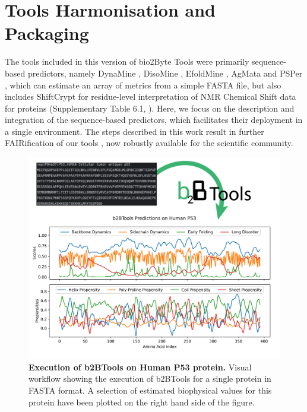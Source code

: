 \section{Tools Harmonisation and Packaging}
The tools included in this version of bio2Byte Tools were primarily sequence-based predictors, namely DynaMine \cite{cilia_protein_2013}, DisoMine \cite{orlando_prediction_2022}, EfoldMine \cite{raimondi_exploring_2017}, AgMata \cite{orlando_accurate_2020} and PSPer \cite{orlando_computational_2019}, which can estimate an array of metrics from a simple FASTA file, but also includes ShiftCrypt \cite{orlando_shiftcrypt_2020} for residue-level interpretation of NMR Chemical Shift data for proteins (Supplementary Table 6.1, ). 
Here, we focus on the description and integration of the sequence-based predictors, which facilitates their deployment in a single environment. The steps described in this work result in further FAIRification of our tools \cite{wilkinson_fair_2016}, now robustly available for the scientific community.

\begin{figure}[tbh]
    \centering
    \includegraphics[width=1\linewidth]{b2b_deployment//Fig/output_figure_v2.pdf}
    \caption{\textbf{Execution of b2BTools on Human P53 protein.} Visual workflow showing the execution of b2BTools for a single protein in FASTA format. A selection of estimated biophysical values for this protein have been plotted on the right hand side of the figure.}
    \label{fig:output_example}
\end{figure}



